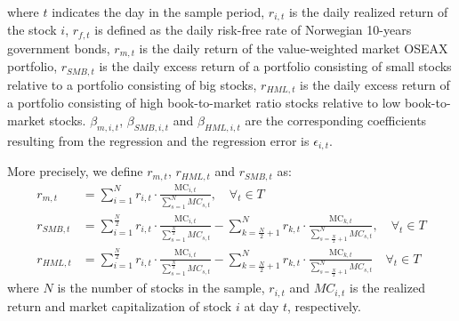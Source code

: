 where $t$ indicates the day in the sample period, $r_{i,t}$ is the daily realized return of the stock $i$, $r_{f,t}$ is defined as the daily risk-free rate of Norwegian 10-years government bonds, $r_{m,t}$ is the daily return of the value-weighted market OSEAX portfolio, $r_{SMB,t}$ is the daily excess return of a portfolio consisting of small stocks relative to a portfolio consisting of big stocks, $r_{HML,t}$ is the daily excess return of a portfolio consisting of high book-to-market ratio stocks relative to low book-to-market stocks. $\beta_{m,i,t}$, $\beta_{SMB,i,t}$ and $\beta_{HML,i,t}$ are the corresponding coefficients resulting from the regression and the regression error is $\epsilon_{i,t}$.

More precisely, we define $r_{m,t}$, $r_{HML,t}$ and $r_{SMB,t}$ as:
\begin{align}
    r_{m,t} &= \sum_{i=1}^{N} r_{i,t} \cdot \frac{\text{MC}_{i,t}}{\sum_{s=1}^{N} MC_{s,t}},  \quad  \forall_t \in T \\
    r_{SMB,t} &= \sum_{i=1}^{\frac{N}{2}} r_{i,t} \cdot \frac{\text{MC}_{i,t}}{\sum_{s=1}^{\frac{N}{2}} MC_{s,t}} - \sum_{k=\frac{N}{2}+1}^{N} r_{k,t} \cdot \frac{\text{MC}_{k,t}}{\sum_{s={\frac{N}{2}+1}}^{N} MC_{s,t}}, \quad  \forall_t \in T \\
    r_{HML,t} &= \sum_{i=1}^{\frac{N}{2}} r_{i,t} \cdot \frac{\text{MC}_{i,t}}{\sum_{s=1}^{\frac{N}{2}} MC_{s,t}} - \sum_{k=\frac{N}{2}+1}^{N} r_{k,t} \cdot \frac{\text{MC}_{k,t}}{\sum_{s=\frac{N}{2}+1}^{N} MC_{s,t}} \quad  \forall_t \in T
\end{align}
where $N$ is the number of stocks in the sample, $r_{i,t}$ and $MC_{i,t}$ is the realized return and market capitalization of stock $i$ at day $t$, respectively. 

